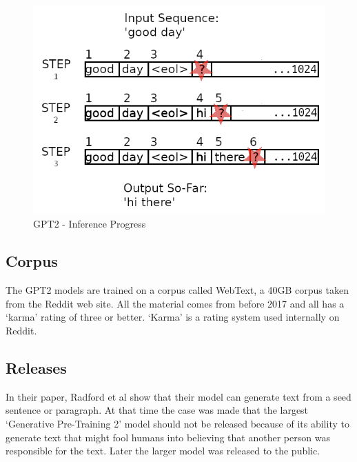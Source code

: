 \begin{figure}[H]
	\begin{center}
		
		
		\includegraphics[scale=2.0]{diagram-inference-02}
	\end{center}
	\caption[Generative Pre-Training 2 Inference]{GPT2 - Inference Progress}
	
	
\end{figure}

\subsection{Corpus}
The GPT2 models are trained on a corpus called WebText, a 40GB corpus taken from the Reddit web site. All the material comes from before 2017 and all has a `karma' rating of three or better. `Karma' is a rating system used internally on Reddit. 


\subsection{Releases}
In their paper, Radford et al \cite{radford2019language} show that their model can generate text from a seed sentence or paragraph. At that time the case was made that the largest `Generative Pre-Training 2' model should not be released because of its ability to generate text that might fool humans into believing that another person was responsible for the text. Later the larger model was released to the public.

